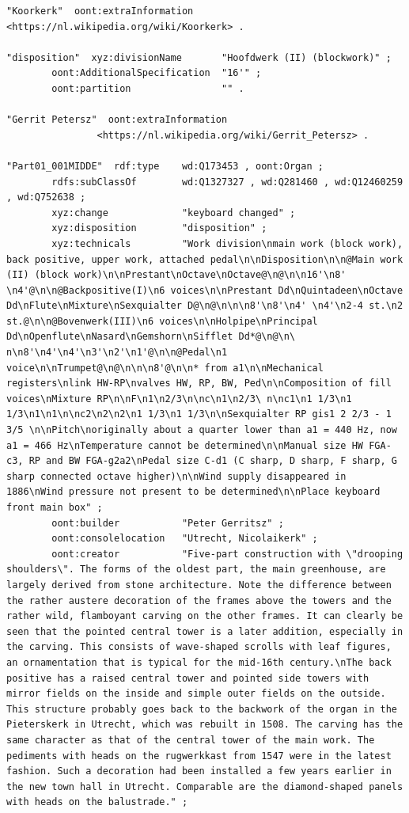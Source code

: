 \begin{lstlisting}[caption={Part01\_001MIDDE}]
"Koorkerk"  oont:extraInformation  <https://nl.wikipedia.org/wiki/Koorkerk> .

"disposition"  xyz:divisionName       "Hoofdwerk (II) (blockwork)" ;
        oont:AdditionalSpecification  "16'" ;
        oont:partition                "" .

"Gerrit Petersz"  oont:extraInformation
                <https://nl.wikipedia.org/wiki/Gerrit_Petersz> .

"Part01_001MIDDE"  rdf:type    wd:Q173453 , oont:Organ ;
        rdfs:subClassOf        wd:Q1327327 , wd:Q281460 , wd:Q12460259 , wd:Q752638 ;
        xyz:change             "keyboard changed" ;
        xyz:disposition        "disposition" ;
        xyz:technicals         "Work division\nmain work (block work), back positive, upper work, attached pedal\n\nDisposition\n\n@Main work (II) (block work)\n\nPrestant\nOctave\nOctave@\n@\n\n16'\n8' \n4'@\n\n@Backpositive(I)\n6 voices\n\nPrestant Dd\nQuintadeen\nOctave Dd\nFlute\nMixture\nSexquialter D@\n@\n\n\n8'\n8'\n4' \n4'\n2-4 st.\n2 st.@\n\n@Bovenwerk(III)\n6 voices\n\nHolpipe\nPrincipal Dd\nOpenflute\nNasard\nGemshorn\nSifflet Dd*@\n@\n\ n\n8'\n4'\n4'\n3'\n2'\n1'@\n\n@Pedal\n1 voice\n\nTrumpet@\n@\n\n\n8'@\n\n* from a1\n\nMechanical registers\nlink HW-RP\nvalves HW, RP, BW, Ped\n\nComposition of fill voices\nMixture RP\n\nF\n1\n2/3\n\nc\n1\n2/3\ n\nc1\n1 1/3\n1 1/3\n1\n1\n\nc2\n2\n2\n1 1/3\n1 1/3\n\nSexquialter RP gis1 2 2/3 - 1 3/5 \n\nPitch\noriginally about a quarter lower than a1 = 440 Hz, now a1 = 466 Hz\nTemperature cannot be determined\n\nManual size HW FGA-c3, RP and BW FGA-g2a2\nPedal size C-d1 (C sharp, D sharp, F sharp, G sharp connected octave higher)\n\nWind supply disappeared in 1886\nWind pressure not present to be determined\n\nPlace keyboard front main box" ;
        oont:builder           "Peter Gerritsz" ;
        oont:consolelocation   "Utrecht, Nicolaikerk" ;
        oont:creator           "Five-part construction with \"drooping shoulders\". The forms of the oldest part, the main greenhouse, are largely derived from stone architecture. Note the difference between the rather austere decoration of the frames above the towers and the rather wild, flamboyant carving on the other frames. It can clearly be seen that the pointed central tower is a later addition, especially in the carving. This consists of wave-shaped scrolls with leaf figures, an ornamentation that is typical for the mid-16th century.\nThe back positive has a raised central tower and pointed side towers with mirror fields on the inside and simple outer fields on the outside. This structure probably goes back to the backwork of the organ in the Pieterskerk in Utrecht, which was rebuilt in 1508. The carving has the same character as that of the central tower of the main work. The pediments with heads on the rugwerkkast from 1547 were in the latest fashion. Such a decoration had been installed a few years earlier in the new town hall in Utrecht. Comparable are the diamond-shaped panels with heads on the balustrade." ;

\end{lstlisting}
